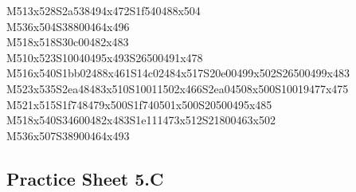 \documentclass{article}
\begin{document}
\begin{multicols}{5}
\begin{center}
M513x528S2a538494x472S1f540488x504 %
\\M536x504S38800464x496 %
\\M518x518S30c00482x483 %
\\M510x523S10040495x493S26500491x478 %
\\M516x540S1bb02488x461S14c02484x517S20e00499x502S26500499x483 %
\\M523x535S2ea48483x510S10011502x466S2ea04508x500S10019477x475 %
\\M521x515S1f748479x500S1f740501x500S20500495x485 %
\\M518x540S34600482x483S1e111473x512S21800463x502 %
\\M536x507S38900464x493 %
\vfil

\end{center}
\end{multicols}

\subsection{Practice Sheet 5.C}
\end{document}
